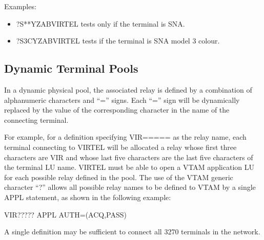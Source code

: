 \documentclass[letterpaper,10pt,english]{sphinxmanual}
\begin{document}
\sphinxAtStartPar
Examples:
\begin{itemize}
\item {} 
\sphinxAtStartPar
?S**YZABVIRTEL tests only if the terminal is SNA.

\item {} 
\sphinxAtStartPar
?S3CYZABVIRTEL tests if the terminal is SNA model 3 colour.

\end{itemize}

\ignorespaces 

\subsection{Dynamic Terminal Pools}
\label{\detokenize{connectivity_guide:dynamic-terminal-pools}}\label{\detokenize{connectivity_guide:index-140}}
\sphinxAtStartPar
In a dynamic physical pool, the associated relay is defined by a combination of alphanumeric characters and “=” signs. Each “=” sign will be dynamically replaced by the value of the corresponding character in the name of the connecting
terminal.

\sphinxAtStartPar
For example, for a definition specifying VIR===== as the relay name, each terminal connecting to VIRTEL will be allocated a relay whose first three characters are VIR and whose last five characters are the last five characters of the terminal LU name. VIRTEL must be able to open a VTAM application LU for each possible relay defined in the pool. The use of the VTAM generic character “?” allows all possible relay names to be defined to VTAM by a single APPL statement, as shown in the following example:

\begin{sphinxVerbatim}[commandchars=\\\{\}]
VIR????? APPL AUTH=(ACQ,PASS)
\end{sphinxVerbatim}

\sphinxAtStartPar
A single definition may be sufficient to connect all 3270 terminals in the network.

\ignorespaces 
\end{document}
